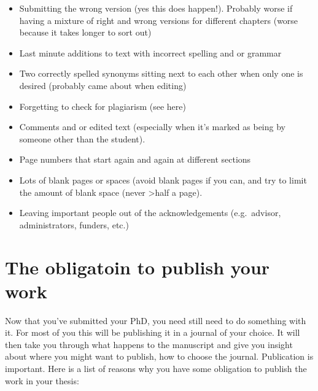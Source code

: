 \documentclass[
]{krantz}
\providecommand{\tightlist}{%
  \setlength{\itemsep}{0pt}\setlength{\parskip}{0pt}}
\begin{document}
\begin{itemize}
\tightlist
\item
  Submitting the wrong version (yes this does happen!). Probably worse if having a mixture of right and wrong versions for different chapters (worse because it takes longer to sort out)
\item
  Last minute additions to text with incorrect spelling and or grammar
\item
  Two correctly spelled synonyms sitting next to each other when only one is desired (probably came about when editing)
\item
  Forgetting to check for plagiarism (see here)
\item
  Comments and or edited text (especially when it's marked as being by someone other than the student).
\item
  Page numbers that start again and again at different sections
\item
  Lots of blank pages or spaces (avoid blank pages if you can, and try to limit the amount of blank space (never \textgreater half a page).
\item
  Leaving important people out of the acknowledgements (e.g.~advisor, administrators, funders, etc.)
\end{itemize}

\hypertarget{publish}{%
\chapter*{The obligatoin to publish your work}\label{publish}}


Now that you've submitted your PhD, you need still need to do something with it. For most of you this will be publishing it in a journal of your choice. It will then take you through what happens to the manuscript and give you insight about where you might want to publish, how to choose the journal. Publication is important. Here is a list of reasons why you have some obligation to publish the work in your thesis:
\end{document}
